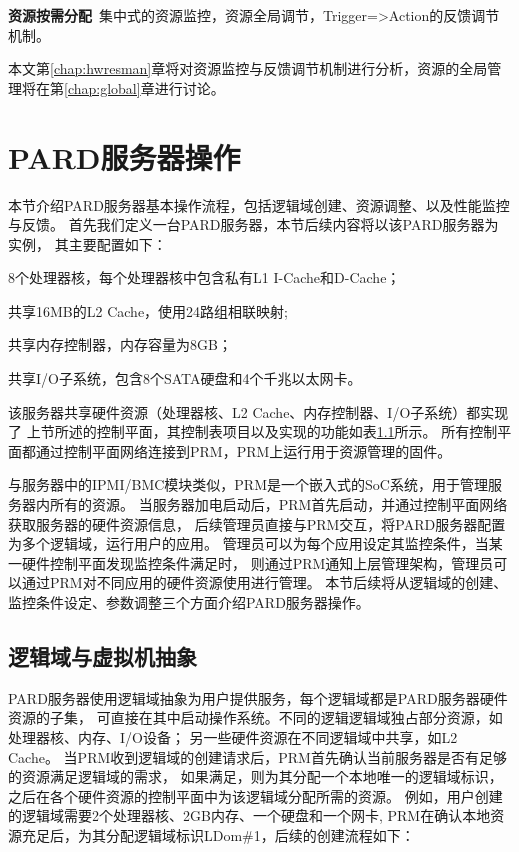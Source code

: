 \textbf{资源按需分配}\ 集中式的资源监控，资源全局调节，Trigger=>Action的反馈调节机制。


本文第\ref{chap:hwresman}章将对资源监控与反馈调节机制进行分析，资源的全局管理将在第\ref{chap:global}章进行讨论。


\section{PARD服务器操作}

本节介绍PARD服务器基本操作流程，包括逻辑域创建、资源调整、以及性能监控与反馈。
首先我们定义一台PARD服务器，本节后续内容将以该PARD服务器为实例，
其主要配置如下：

8个处理器核，每个处理器核中包含私有L1 I-Cache和D-Cache；

共享16MB的L2 Cache，使用24路组相联映射;

共享内存控制器，内存容量为8GB；

共享I/O子系统，包含8个SATA硬盘和4个千兆以太网卡。

该服务器共享硬件资源（处理器核、L2 Cache、内存控制器、I/O子系统）都实现了
上节所述的控制平面，其控制表项目以及实现的功能如表\ref{}所示。
所有控制平面都通过控制平面网络连接到PRM，PRM上运行用于资源管理的固件。

与服务器中的IPMI/BMC模块类似，PRM是一个嵌入式的SoC系统，用于管理服务器内所有的资源。
当服务器加电启动后，PRM首先启动，并通过控制平面网络获取服务器的硬件资源信息，
后续管理员直接与PRM交互，将PARD服务器配置为多个逻辑域，运行用户的应用。
管理员可以为每个应用设定其监控条件，当某一硬件控制平面发现监控条件满足时，
则通过PRM通知上层管理架构，管理员可以通过PRM对不同应用的硬件资源使用进行管理。
本节后续将从逻辑域的创建、监控条件设定、参数调整三个方面介绍PARD服务器操作。

\subsection{逻辑域与虚拟机抽象}

PARD服务器使用逻辑域抽象为用户提供服务，每个逻辑域都是PARD服务器硬件资源的子集，
可直接在其中启动操作系统。不同的逻辑逻辑域独占部分资源，如处理器核、内存、I/O设备；
另一些硬件资源在不同逻辑域中共享，如L2 Cache。
当PRM收到逻辑域的创建请求后，PRM首先确认当前服务器是否有足够的资源满足逻辑域的需求，
如果满足，则为其分配一个本地唯一的逻辑域标识，
之后在各个硬件资源的控制平面中为该逻辑域分配所需的资源。
例如，用户创建的逻辑域需要2个处理器核、2GB内存、一个硬盘和一个网卡,
PRM在确认本地资源充足后，为其分配逻辑域标识LDom\#1，后续的创建流程如下：

